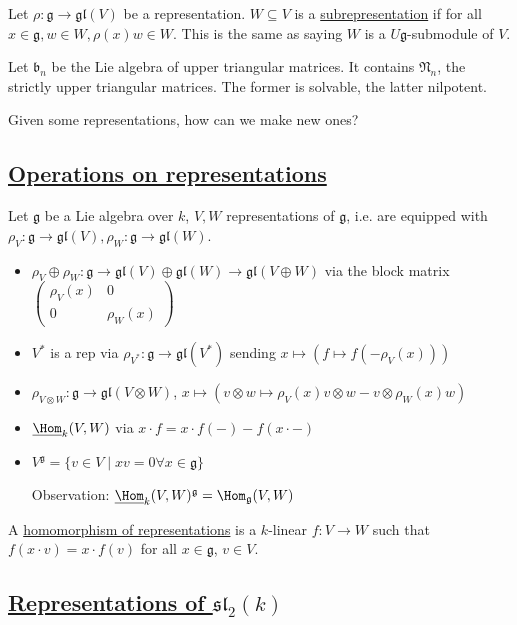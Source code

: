 \documentclass[x11names,reqno,14pt]{extarticle}
\newcommand{\pmat}[4]{\begin{pmatrix} #1 & #2 \\ #3 & #4 \end{pmatrix}}
\newcommand{\mk}[1]{\mathfrak{#1}}
\newcommand{\g}{\mk{g}}
\newcommand{\gl}{\mk{g}\mk{l}}
\renewcommand{\sl}{\mk{s}\mk{l}}
\begin{document}

Let $\rho:\g\to\gl(V)$ be a representation. $W \subseteq V$ is a \underline{subrepresentation} if for all $x \in \g, w \in W, \rho(x)w \in W$. This is the same as saying $W$ is a $U\g$-submodule of $V$. 

\exm

Let $\mk{b}_n$ be the Lie algebra of upper triangular matrices. It contains $\mk{N}_n$, the strictly upper triangular matrices. The former is solvable, the latter nilpotent. 

Given some representations, how can we make new ones? 

\subsection*{\underline{Operations on representations}}

Let $\g$ be a Lie algebra over $k$, $V, W$ representations of $\g$, i.e. are equipped with $\rho_V:\g\to\gl(V),\rho_W:\g\to\gl(W)$.

\begin{itemize}

\item $\rho_V\oplus\rho_W:\g\to\gl(V)\oplus\gl(W) \to \gl(V\oplus W)$ via the block matrix $\pmat{\rho_V(x)}{0}{0}{\rho_W(x)}$

\item $V^*$ is a rep via $\rho_{V^*}:\g\to\gl(V^*)$ sending $x \mapsto (f \mapsto f(-\rho_V(x)))$

\item $\rho_{V\otimes W}:\g\to\gl(V\otimes W)$, $x \mapsto (v\otimes w \mapsto \rho_V(x)v\otimes w - v\otimes\rho_W(x)w)$

\item $\underline{\Hom}_k(V,W)$ via $x\cdot f = x\cdot f(-) - f(x\cdot -)$

\item $V^\g = \{v\in V \mid xv = 0 \forall x \in \g\}$

Observation: $\underline{\Hom}_k(V,W)^\g = \Hom_\g(V,W)$
\end{itemize}


A \underline{homomorphism of representations} is a $k$-linear $f:V\to W$ such that $f(x\cdot v) = x\cdot f(v)$ for all $x \in \g$, $v \in V$. 

\subsection*{\underline{Representations of $\sl_2(k)$}}
\end{document}
